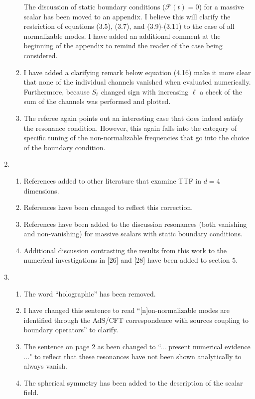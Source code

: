 \documentclass[11pt,letterpaper]{article}
\newcommand{\mc}{\mathcal}
\begin{document}
\begin{enumerate}
\begin{enumerate}
        The discussion of static boundary conditions ($\mc F(t) = 0$) for a massive scalar has been moved to an appendix. I believe this will clarify the restriction of equations (3.5), (3.7), and (3.9)-(3.11) to the case of all normalizable modes. I have added an additional comment at the beginning of the appendix to remind the reader of the case being considered.
        \item I have added a clarifying remark below equation (4.16) make it more clear that none of the individual channels vanished when evaluated numerically. Furthermore, because $S_\ell$ changed sign with increasing $\ell$ a check of the sum of the channels was performed and plotted.
        \item The referee again points out an interesting case that does indeed satisfy the resonance condition. However, this again falls into the category of specific tuning of the non-normalizable frequencies that go into the choice of the boundary condition. 
    \end{enumerate}
    \item %
    \begin{enumerate}
        \item References added to other literature that examine TTF in $d = 4$ dimensions.
        \item References have been changed to reflect this correction.
        \item References have been added to the discussion resonances (both vanishing and non-vanishing) for massive scalars with static boundary conditions.
        \item Additional discussion contrasting the results from this work to the numerical investigations in [26] and [28] have been added to section 5.
    \end{enumerate}
    \item %
    \begin{enumerate}
        \item The word ``holographic'' has been removed.
        \item I have changed this sentence to read ``[n]on-normalizable modes are identified through the AdS/CFT correspondence with sources coupling to boundary operators'' to clarify.
        \item The sentence on page 2 as been changed to ``... present numerical evidence ..." to reflect that these resonances have not been shown analytically to always vanish.
        \item The spherical symmetry has been added to the description of the scalar field.

\end{enumerate}
\end{enumerate}
\end{document}
